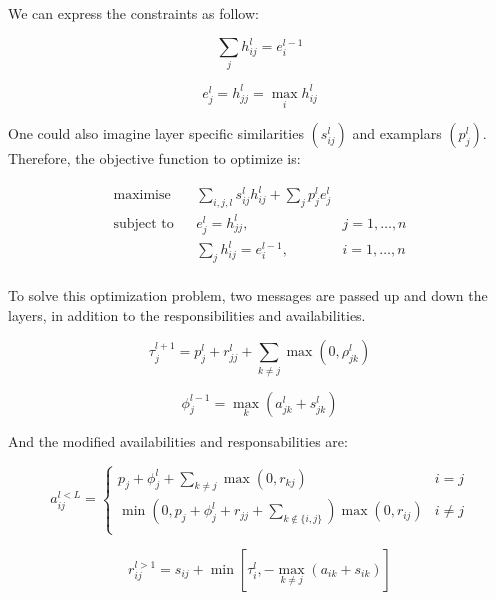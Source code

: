 \documentclass{ipol}
\begin{document}
We can express the constraints as follow:

\begin{equation}
\sum_{j} h_{ij}^l = e_i^{l-1}
\end{equation}

\begin{equation}
e_j^l = h_{jj}^l = \max_i h_{ij}^l
\end{equation}

One could also imagine layer specific similarities $(s^l_{ij})$ and examplars
$(p^l_j)$. Therefore, the objective function to optimize is:

\begin{equation*}
\renewcommand{\arraystretch}{2}
\begin{array}{ccll}
\text{maximise} & & \sum_{i, j, l} s^l_{ij} h^l_{ij} + \sum_{j} p^l_j e^l_j \\
\text{subject to} &  & e^l_{j} = h^l_{jj}, & j = 1, \dots, n\\
		  &  & \sum_{j} h_{ij}^l = e_i^{l-1}, & i = 1, \dots, n\\

\end{array}
\end{equation*}

To solve this optimization problem, two messages are passed up and down the
layers, in addition to the responsibilities and availabilities.

\begin{equation}
\tau_j^{l + 1} = p^l_j + r_{jj}^l + \sum_{k \neq j} \max (0, \rho^l_{jk})
\end{equation}

\begin{equation}
\phi_j^{l - 1} = \max_k (a_{jk}^l + s_{jk}^l)
\end{equation}

And the modified availabilities and responsabilities are:

\begin{equation}
a_{ij}^{l < L} = \begin{cases}
	    p_j + \phi_j^l + \sum_{k \neq j} \max(0, r_{kj}) &  i = j \\
	    \min ( 0, p_j + \phi_j^l + r_{jj} + \sum_{k \notin \{i, j\} } ) \max (0, r_{ij}) & i \neq j\\
	 \end{cases}
\end{equation}

\begin{equation*}
r_{ij}^{l > 1} = s_{ij}  + \min [ \tau_i^l, - \max_{k \neq j} (a_{ik} + s_{ik}) ]
\end{equation*}
\end{document}
